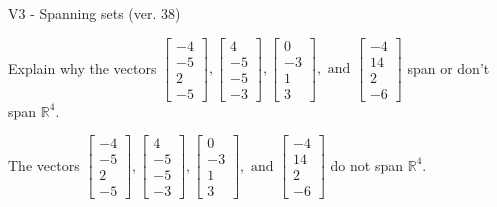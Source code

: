 \begin{exercise}
  \begin{exerciseTitle}V3 - Spanning sets (ver. 38)\end{exerciseTitle}
  \begin{exerciseStatement}
    Explain why the vectors \(\left[\begin{array}{r}
-4 \\
-5 \\
2 \\
-5
\end{array}\right] , \left[\begin{array}{r}
4 \\
-5 \\
-5 \\
-3
\end{array}\right] , \left[\begin{array}{r}
0 \\
-3 \\
1 \\
3
\end{array}\right] , \text{ and } \left[\begin{array}{r}
-4 \\
14 \\
2 \\
-6
\end{array}\right]\) span or don't span \(\mathbb{R}^4\). 
	


  \end{exerciseStatement}
  \begin{exerciseAnswer}
   The vectors \(\left[\begin{array}{r}
-4 \\
-5 \\
2 \\
-5
\end{array}\right] , \left[\begin{array}{r}
4 \\
-5 \\
-5 \\
-3
\end{array}\right] , \left[\begin{array}{r}
0 \\
-3 \\
1 \\
3
\end{array}\right] , \text{ and } \left[\begin{array}{r}
-4 \\
14 \\
2 \\
-6
\end{array}\right]\) 
  	 do not  
	span \(\mathbb{R}^4\).
  


  \end{exerciseAnswer}
\end{exercise}